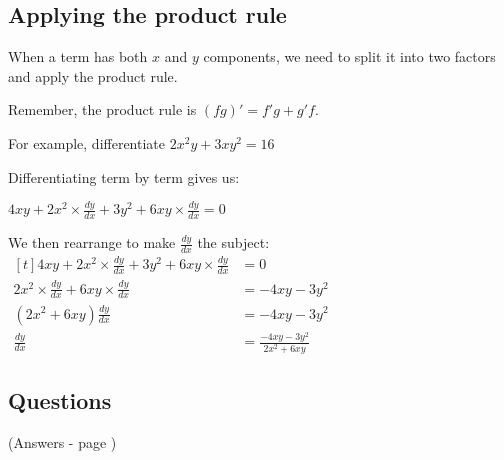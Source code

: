 \documentclass[../main.tex]{subfiles}
\begin{document}
\subsection*{Applying the product rule}
When a term has both \(x\) and \(y\) components, we need to split it into two factors and apply the product rule.

Remember, the product rule is \( (fg)' = f'g +g'f\).

For example, differentiate \(2x^2y+3xy^2=16\)

Differentiating term by term gives us:

\(4xy + 2x^2\times\frac{dy}{dx}+3y^2+6xy\times\frac{dy}{dx}=0\)

We then rearrange to make \(\frac{dy}{dx}\) the subject:
    $
    \!
    \begin{aligned}[t]
     4xy + 2x^2\times\frac{dy}{dx}+3y^2+6xy\times\frac{dy}{dx}
        &= 0 \\
     2x^2\times\frac{dy}{dx}+6xy\times\frac{dy}{dx}
        &= -4xy-3y^2 \\
    (2x^2+6xy)\frac{dy}{dx}
        &= -4xy-3y^2 \\
    \frac{dy}{dx}
        &= \frac{-4xy-3y^2}{2x^2+6xy}
    \end{aligned}
    $

\pagebreak

\subsection*{Questions}
(Answers - page {\pageref*{Implicit differentiation answers}})
\label{Implicit Differentiation}
\end{document}
